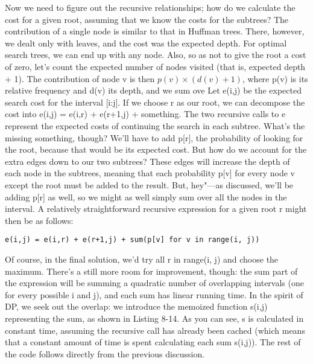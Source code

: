 Now we need to figure out the recursive relationships; how do we calculate the cost for a given root, assuming that we know the costs for the subtrees? The contribution of a single node is similar to that in Huffman trees. There, however, we dealt only with leaves, and the cost was the expected depth. For optimal search trees, we can end up with any node. Also, so as not to give the root a cost of zero, let's count the expected number of nodes visited (that is, expected depth + 1). The contribution of node v is then $p(v) \times (d(v) + 1)$, where p(v) is its relative frequency and d(v) its depth, and we sum ove Let e(i,j) be the expected search cost for the interval [i:j]. If we choose r as our root, we can decompose the cost into e(i,j) = e(i,r) + e(r+1,j) + something. The two recursive calls to e represent the expected costs of continuing the search in each subtree. What's the missing something, though? We'll have to add p[r], the probability of looking for the root, because that would be its expected cost. But how do we account for the extra edges down to our two subtrees? These edges will increase the depth of
each node in the subtrees, meaning that each probability p[v] for every node v except the root must be added to the result. But, hey"---as discussed, we'll be adding p[r] as well, so we might as well simply sum over all the nodes in the interval. A relatively straightforward recursive expression for a given root r might then be as follows:
\begin{lstlisting}
e(i,j) = e(i,r) + e(r+1,j) + sum(p[v] for v in range(i, j))
\end{lstlisting}

Of course, in the final solution, we'd try all r in range(i, j) and choose the maximum. There's a still more room for improvement, though: the sum part of the expression will be summing a quadratic number of overlapping intervals (one for every possible i and j), and each sum has linear running time. In the spirit of DP, we seek out the overlap: we introduce the memoized function s(i,j) representing the sum, as shown in Listing 8-14. As you can see, s is calculated in constant time, assuming the recursive call has already been cached (which means that a constant amount of time is spent calculating each sum s(i,j)). The rest of the code follows directly from the previous discussion. 

